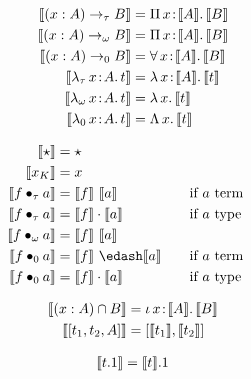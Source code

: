 
\begin{figure}
    \centering
    \begin{minipage}{0.5\textwidth}
        \begin{align*}
            \sema{(x : A) \to_\tau B} &= \abs{\Pi}{x}{\sema{A}}{\sema{B}} \\
            \sema{(x : A) \to_\omega B} &= \abs{\Pi}{x}{\sema{A}}{\sema{B}} \\
            \sema{(x : A) \to_0 B} &= \abs{\forall}{x}{\sema{A}}{\sema{B}} \\
            \sema{\abs{\lambda_\tau}{x}{A}{t}} &= \abs{\lambda}{x}{\sema{A}}{\sema{t}} \\
            \sema{\abs{\lambda_\omega}{x}{A}{t}} &= \absu{\lambda}{x}{\sema{t}}\\
            \sema{\abs{\lambda_0}{x}{A}{t}} &= \absu{\Lambda}{x}{\sema{t}}
        \end{align*}
    \end{minipage}%
    \begin{minipage}{0.5\textwidth}
        \begin{align*}
            \sema{\star} &= \star \\
            \sema{x_K} &= x \\
            \sema{\app{f}{\tau}{a}} &= \sema{f}\ \sema{a} \quad&\text{if }& a\pterm \\
            \sema{\app{f}{\tau}{a}} &= \sema{f} \cdot \sema{a} \quad&\text{if }& a\ptype \\
            \sema{\app{f}{\omega}{a}} &= \sema{f}\ \sema{a} \\
            \sema{\app{f}{0}{a}} &= \sema{f}\ \edash \sema{a} \quad&\text{if }& a\pterm \\
            \sema{\app{f}{0}{a}} &= \sema{f} \cdot \sema{a} \quad&\text{if }& a\ptype
        \end{align*}
    \end{minipage}
    \begin{minipage}{0.5\textwidth}
        \begin{align*}
            \llbracket (x : A) \cap B \rrbracket &= {\iota}\, x\! : \! \llbracket A \rrbracket.\, \llbracket B \rrbracket \\
            \llbracket [t_1, t_2, A] \rrbracket &= [\llbracket t_1 \rrbracket, \llbracket t_2 \rrbracket]
        \end{align*}
    \end{minipage}%
    \begin{minipage}{0.5\textwidth}
        \begin{align*}
            \sema{t.1} &= \sema{t}.1 \\

\end{align*}
\end{minipage}
\end{figure}
